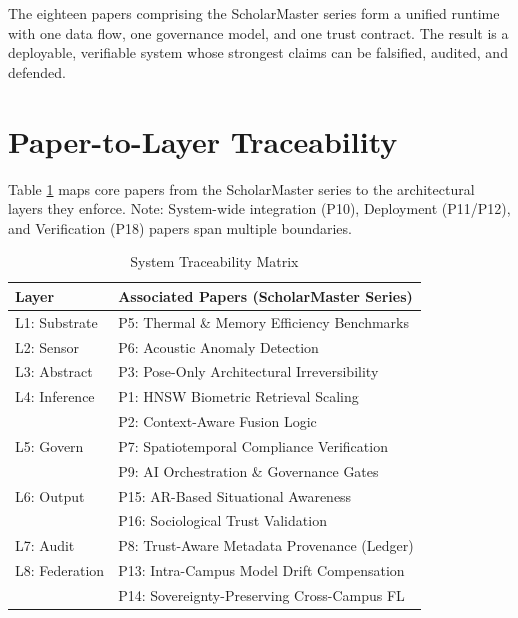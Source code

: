 \documentclass[conference]{IEEEtran}
\begin{document}
The eighteen papers comprising the ScholarMaster series form a unified runtime with one data flow, one governance model, and one trust contract. The result is a deployable, verifiable system whose strongest claims can be falsified, audited, and defended.

\appendices

\section{Paper-to-Layer Traceability}
Table \ref{tab:trace} maps core papers from the ScholarMaster series to the architectural layers they enforce. Note: System-wide integration (P10), Deployment (P11/P12), and Verification (P18) papers span multiple boundaries.

\begin{table}[h]
\caption{System Traceability Matrix}
\centering
\begin{tabular}{p{1.5cm} p{6.5cm}}
\toprule
\textbf{Layer} & \textbf{Associated Papers (ScholarMaster Series)} \\
\midrule
L1: Substrate & P5: Thermal \& Memory Efficiency Benchmarks \\
\midrule
L2: Sensor    & P6: Acoustic Anomaly Detection \\
\midrule
L3: Abstract  & P3: Pose-Only Architectural Irreversibility \\
\midrule
L4: Inference & P1: HNSW Biometric Retrieval Scaling \\
              & P2: Context-Aware Fusion Logic \\
\midrule
L5: Govern    & P7: Spatiotemporal Compliance Verification \\
              & P9: AI Orchestration \& Governance Gates \\
\midrule
L6: Output    & P15: AR-Based Situational Awareness \\
              & P16: Sociological Trust Validation \\
\midrule
L7: Audit     & P8: Trust-Aware Metadata Provenance (Ledger) \\
\midrule
L8: Federation & P13: Intra-Campus Model Drift Compensation \\
               & P14: Sovereignty-Preserving Cross-Campus FL \\
\bottomrule
\end{tabular}
\label{tab:trace}
\end{table}
\end{document}
